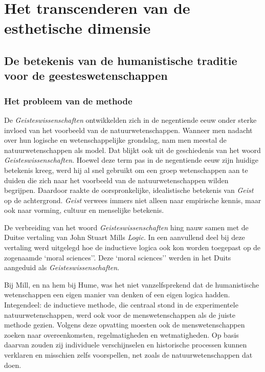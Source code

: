 \chapter{Het transcenderen van de esthetische dimensie}

\section{De betekenis van de humanistische traditie voor de geesteswetenschappen}

\subsection{Het probleem van de methode}

De \textit{Geisteswissenschaften} ontwikkelden zich in de negentiende eeuw onder sterke invloed van het voorbeeld van de natuurwetenschappen. Wanneer men nadacht over hun logische en wetenschappelijke grondslag, nam men meestal de natuurwetenschappen als model. Dat blijkt ook uit de geschiedenis van het woord \textit{Geisteswissenschaften}. Hoewel deze term pas in de negentiende eeuw zijn huidige betekenis kreeg, werd hij al snel gebruikt om een groep wetenschappen aan te duiden die zich naar het voorbeeld van de natuurwetenschappen wilden begrijpen. Daardoor raakte de oorspronkelijke, idealistische betekenis van \textit{Geist} op de achtergrond. \textit{Geist} verwees immers niet alleen naar empirische kennis, maar ook naar vorming, cultuur en menselijke betekenis.

De verbreiding van het woord \textit{Geisteswissenschaften} hing nauw samen met de Duitse vertaling van John Stuart Mills \textit{Logic}. In een aanvullend deel bij deze vertaling werd uitgelegd hoe de inductieve logica ook kon worden toegepast op de zogenaamde `moral sciences''. Deze `moral sciences'' werden in het Duits aangeduid als \textit{Geisteswissenschaften}.

Bij Mill, en na hem bij Hume, was het niet vanzelfsprekend dat de humanistische wetenschappen een eigen manier van denken of een eigen logica hadden. Integendeel: de inductieve methode, die centraal stond in de experimentele natuurwetenschappen, werd ook voor de menswetenschappen als de juiste methode gezien. Volgens deze opvatting moesten ook de menswetenschappen zoeken naar overeenkomsten, regelmatigheden en wetmatigheden. Op basis daarvan zouden zij individuele verschijnselen en historische processen kunnen verklaren en misschien zelfs voorspellen, net zoals de natuurwetenschappen dat doen.


